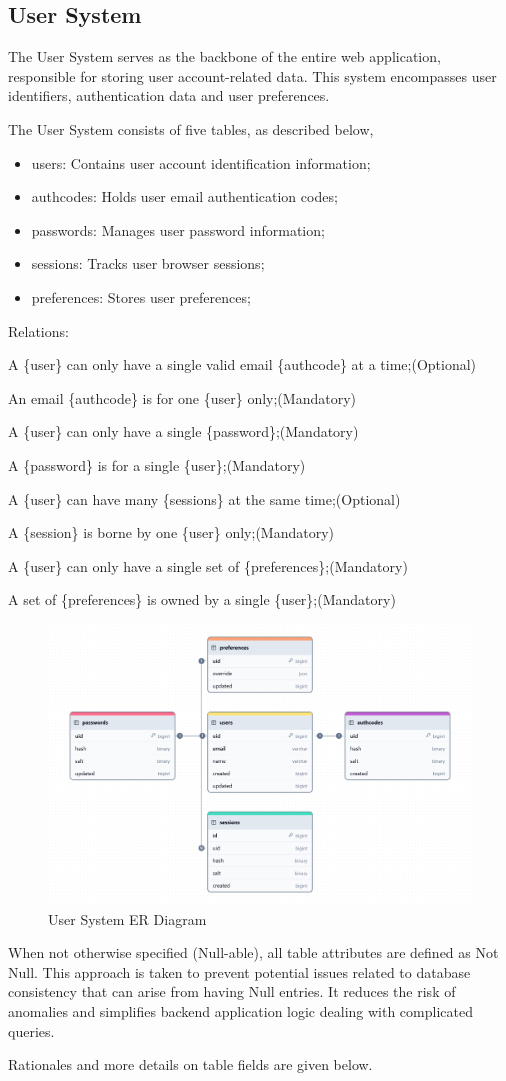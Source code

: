 \documentclass[12pt]{report}
\newcommand{\n}{\par}
\newcommand{\br}{\n\vspace{1 em}\n}
\begin{document}
\subsection{User System} \label{data-layer.design.user-system}
The User System serves as the backbone of the entire web application, responsible for storing user account-related data.
This system encompasses user identifiers, authentication data and user preferences.
\br
The User System consists of five tables, as described below,
\begin{itemize}
	\item users: Contains user account identification information;
	\item authcodes: Holds user email authentication codes;
	\item passwords: Manages user password information;
	\item sessions: Tracks user browser sessions;
	\item preferences: Stores user preferences;
\end{itemize}
Relations:\n
A \{user\} can only have a single valid email \{authcode\} at a time;\null\hfill (Optional)\n
An email \{authcode\} is for one \{user\} only;\null\hfill (Mandatory)
\br
A \{user\} can only have a single \{password\};\null\hfill (Mandatory)\n
A \{password\} is for a single \{user\};\null\hfill (Mandatory)
\br
A \{user\} can have many \{sessions\} at the same time;\null\hfill (Optional)\n
A \{session\} is borne by one \{user\} only;\null\hfill (Mandatory)
\br
A \{user\} can only have a single set of \{preferences\};\null\hfill (Mandatory)\n
A set of \{preferences\} is owned by a single \{user\};\null\hfill (Mandatory)
\begin{figure}[ht!]
	\centering
	\includegraphics[width=1\linewidth]{assets/data-layer/user_system.jpeg}
	\caption{User System ER Diagram}
	\label{fig:user-system-er}
\end{figure}
\br
When not otherwise specified (Null-able), all table attributes are defined as Not Null.
This approach is taken to prevent potential issues related to database consistency that can arise from having Null entries.
It reduces the risk of anomalies and simplifies backend application logic dealing with complicated queries.
\br
Rationales and more details on table fields are given below.\n
\end{document}
